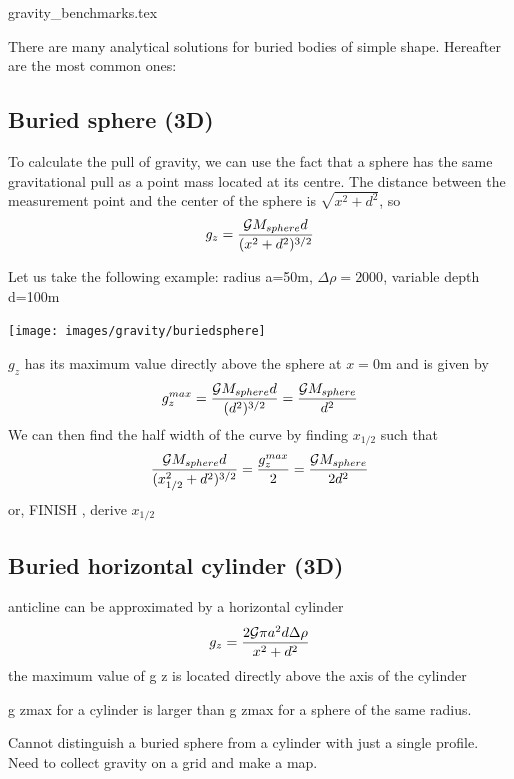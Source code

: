 \begin{flushright} {\tiny {\color{gray} gravity\_benchmarks.tex}} \end{flushright}

There are many analytical solutions for buried bodies of simple shape.
Hereafter are the most common ones:

\subsection{Buried sphere (3D)}

To calculate the pull of gravity, we can use the fact that a sphere has the same
gravitational pull as a point mass located at its centre. The distance between 
the measurement point and the center of the sphere is $\sqrt{x^2+d^2}$, so
\[
g_z = \frac{{\cal G} M_{sphere} d }{(x^2 + d^2)^{3/2}}
\]

Let us take the following example: 
radius a=50m, $\Delta \rho=2000$, variable depth d=100m

\begin{center}
\texttt{[image: images/gravity/buriedsphere]}
\end{center}

$g_z$ has its maximum value directly above the sphere at $x=0$m and is 
given by 
\[
g_{z}^{max}
= \frac{{\cal G} M_{sphere} d }{(d^2)^{3/2}}
= \frac{{\cal G} M_{sphere}  }{d^2}
\]
We can then find the half width of the curve by finding $x_{1/2}$ such that 
\[
\frac{{\cal G} M_{sphere} d }{(x_{1/2}^2 + d^2)^{3/2}} =
\frac{g_{z}^{max}}{2} = \frac{ {\cal G} M_{sphere} }{2 d^2}
\]
or, 
FINISH , derive $x_{1/2}$


\subsection{Buried horizontal cylinder (3D)} 

anticline can be approximated by a horizontal cylinder
\[
g_z=\frac{2 {\cal G} \pi a^2 d \Delta \rho}{x^2+d^2}
\]
the maximum value of g z is located directly above the axis of the cylinder

g zmax for a cylinder is larger than g zmax for a sphere of the same radius.

Cannot distinguish a buried sphere from a cylinder with just a single profile. Need to
collect gravity on a grid and make a map.

